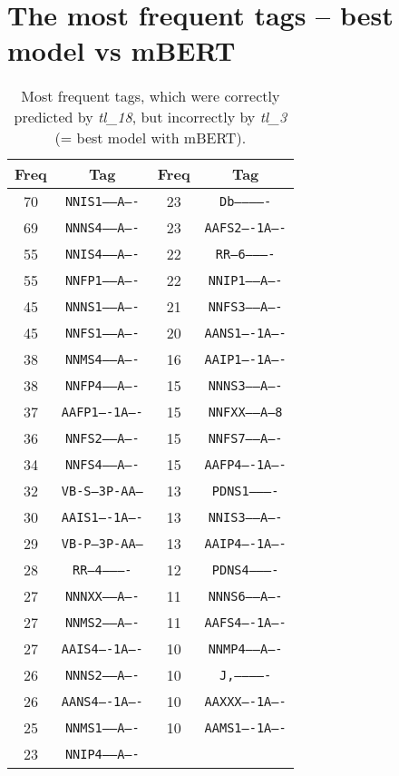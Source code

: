 \section{The most frequent tags -- best model vs mBERT }
\label{att:tags2}
\begin{table}[!h]
\centering
\begin{tabular}{|c|c||c|c|}
\hline
Freq & Tag & Freq & Tag \\ \hline \hline
70 & \texttt{NNIS1-----A----} & 23 & \texttt{Db-------------}   \\
69 & \texttt{NNNS4-----A----} & 23 & \texttt{AAFS2----1A----}   \\
55 & \texttt{NNIS4-----A----} & 22 & \texttt{RR--6----------}  \\
55 & \texttt{NNFP1-----A----} & 22 & \texttt{NNIP1-----A----}  \\
45 & \texttt{NNNS1-----A----} & 21 & \texttt{NNFS3-----A----}   \\
45 & \texttt{NNFS1-----A----} & 20 & \texttt{AANS1----1A----}   \\
38 & \texttt{NNMS4-----A----} & 16 & \texttt{AAIP1----1A----}   \\
38 & \texttt{NNFP4-----A----} & 15 & \texttt{NNNS3-----A----}   \\
37 & \texttt{AAFP1----1A----} & 15 & \texttt{NNFXX-----A---8}   \\
36 & \texttt{NNFS2-----A----} & 15 & \texttt{NNFS7-----A----}  \\
34 & \texttt{NNFS4-----A----} & 15 & \texttt{AAFP4----1A----}   \\
32 & \texttt{VB-S---3P-AA---} & 13 & \texttt{PDNS1----------}  \\
30 & \texttt{AAIS1----1A----} & 13 & \texttt{NNIS3-----A----}  \\
29 & \texttt{VB-P---3P-AA---} & 13 & \texttt{AAIP4----1A----}   \\
28 & \texttt{RR--4----------} & 12 & \texttt{PDNS4----------}   \\
27 & \texttt{NNNXX-----A----} & 11 & \texttt{NNNS6-----A----}   \\
27 & \texttt{NNMS2-----A----} & 11 & \texttt{AAFS4----1A----}   \\
27 & \texttt{AAIS4----1A----} & 10 & \texttt{NNMP4-----A----}   \\
26 & \texttt{NNNS2-----A----} & 10 & \texttt{J,-------------}   \\
26 & \texttt{AANS4----1A----} & 10 & \texttt{AAXXX----1A----}   \\
25 & \texttt{NNMS1-----A----} & 10 & \texttt{AAMS1----1A----}   \\
23 & \texttt{NNIP4-----A----} &  &   \\ \hline             
\end{tabular}
\caption{Most frequent tags, which were correctly predicted by \textit{tl\_18}, but incorrectly by \textit{tl\_3} (= best model with mBERT).}
\end{table}